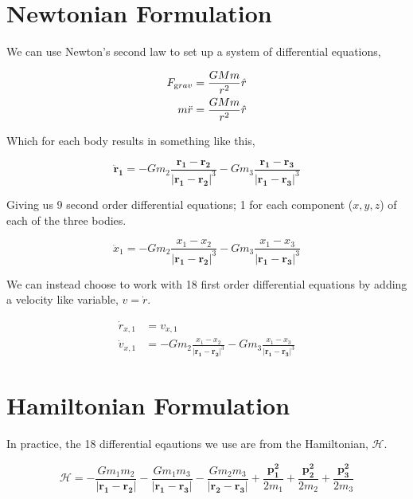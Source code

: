 \documentclass{article}
\newcommand{\norm}[1]{\ensuremath{\left\vert #1 \right \vert}}
\newcommand{\vb}[1]{\ensuremath{\mathbf{#1}}}
\begin{document}
\noindent{}

\section{Newtonian Formulation}

We can use Newton's second law to set up a system of differential equations,

\begin{align}
    F_{\text grav} &= \frac{GMm}{r^2} \hat{r} \\
    m\ddot{r} &= \frac{GMm}{r^2} \hat{r}
\end{align}

\noindent Which for each body results in something like this,

\begin{equation}
    \vb{\ddot{r}_1} = -Gm_2\frac{\vb{r_1} - \vb{r_2}}{\norm{\vb{r_1} - \vb{r_2}}^3} - Gm_3\frac{\vb{r_1} - \vb{r_3}}{\norm{\vb{r_1} - \vb{r_3}}^3}
\end{equation}

\noindent Giving us 9 second order differential equations; 1 for each component ($x, y, z$) of each of the three bodies.

\begin{equation}
    \ddot{x}_1 = -Gm_2\frac{x_1 - x_2}{\norm{\vb{r_1} - \vb{r_2}}^3} - Gm_3\frac{x_1 - x_3}{\norm{\vb{r_1} - \vb{r_3}}^3}
\end{equation}

We can instead choose to work with 18 first order differential equations by adding a velocity like variable, $v = \dot{r}$.

\begin{align}
    \dot{r}_{x, 1} &= v_{x, 1} \\
    \dot{v}_{x, 1} &= -Gm_2\frac{x_1 - x_2}{\norm{\vb{r_1} - \vb{r_2}}^3} - Gm_3\frac{x_1 - x_3}{\norm{\vb{r_1} - \vb{r_3}}^3}
\end{align}

\section{Hamiltonian Formulation}

In practice, the 18 differential eqautions we use are from the Hamiltonian, $\mathcal{H}$.

\begin{equation}
\mathcal{H} = - \frac{G m_1 m_2}{\norm{\vb{r_1} - \vb{r_2}}}
                - \frac{G m_1 m_3}{\norm{\vb{r_1} - \vb{r_3}}}
                - \frac{G m_2 m_3}{\norm{\vb{r_2} - \vb{r_3}}}
                + \frac{\vb{p_1^2}}{2 m_1}
                + \frac{\vb{p_2^2}}{2 m_2}
                + \frac{\vb{p_3^2}}{2 m_3}
\end{equation}
\end{document}
